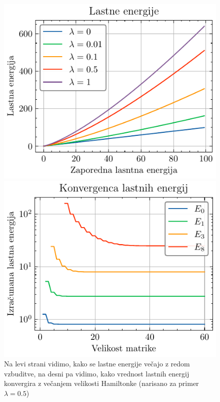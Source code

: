 \documentclass[slovene,11pt,a4paper]{article}
\begin{document}
\begin{figure}[ht]
  \centering
  \begin{minipage}{0.48\textwidth}
    \centering
    \includegraphics[width=\linewidth]{graphs/energ_.pdf}
    
  \end{minipage}%
  \hfill%
  \begin{minipage}{0.48\textwidth}
    \centering
    \includegraphics[width=\linewidth]{graphs/energ_konv.pdf}
    
  \end{minipage}
  \caption{Na levi strani vidimo, kako se lastne energije večajo z redom vzbuditve, na desni pa vidimo, kako vrednost lastnih energij konvergira z večanjem velikosti Hamiltonke (narisano za primer $\lambda = 0.5$)}
  \label{fig: energ}
\end{figure}
\end{document}

